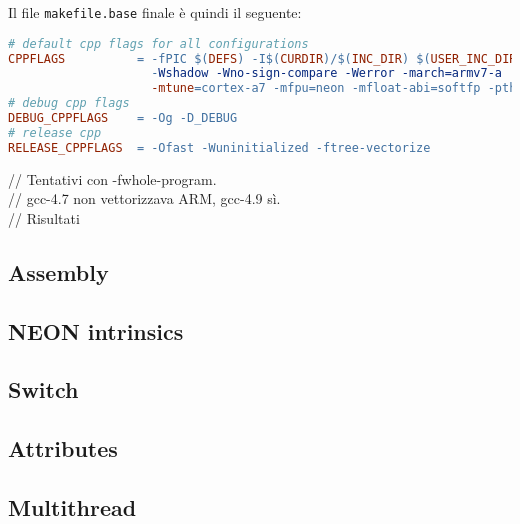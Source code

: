 Il file \verb|makefile.base| finale è quindi il seguente:\\

\begin{lstlisting}[language=make]
# default cpp flags for all configurations
CPPFLAGS          = -fPIC $(DEFS) -I$(CURDIR)/$(INC_DIR) $(USER_INC_DIRS) -Wall 
                    -Wshadow -Wno-sign-compare -Werror -march=armv7-a 
                    -mtune=cortex-a7 -mfpu=neon -mfloat-abi=softfp -pthread
# debug cpp flags
DEBUG_CPPFLAGS    = -Og -D_DEBUG
# release cpp
RELEASE_CPPFLAGS  = -Ofast -Wuninitialized -ftree-vectorize
\end{lstlisting}


// Tentativi con -fwhole-program.\\
// gcc-4.7 non vettorizzava ARM, gcc-4.9 sì.\\
// Risultati\\


\subsection{Assembly}


\subsection{NEON intrinsics}


\subsection{Switch}


\subsection{Attributes}


\subsection{Multithread}

